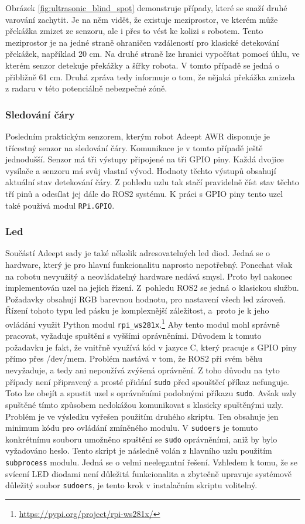 Obrázek \ref{fig:ultrasonic_blind_spot} demonstruje případy, které se snaží druhé varování zachytit. Je na něm vidět, že existuje meziprostor, ve kterém může překážka zmizet ze senzoru, ale i přes to vést ke kolizi s robotem. Tento meziprostor je na jedné straně ohraničen vzdáleností pro klasické detekování překážek, například 20 cm. Na druhé straně lze hranici vypočítat pomocí úhlu, ve kterém senzor detekuje překážky a šířky robota.
V tomto případě se jedná o přibližně 61 cm. Druhá zpráva tedy informuje o tom, že nějaká překážka zmizela z radaru v této potenciálně nebezpečné zóně.

\subsubsection*{Sledování čáry}
Posledním praktickým senzorem, kterým robot Adeept AWR disponuje je třícestný senzor na sledování čáry.
Komunikace je v tomto případě ještě jednodušší. Senzor má tři výstupy připojené na tři GPIO piny. Každá dvojice vysílače a senzoru má svůj vlastní vývod. Hodnoty těchto výstupů obsahují aktuální stav detekování čáry. Z pohledu uzlu tak stačí pravidelně číst stav těchto tří pinů a odesílat jej dále do ROS2 systému. K práci s GPIO piny tento uzel také používá modul \verb|RPi.GPIO|.

\subsubsection*{Led}
Součástí Adeept sady je také několik adresovatelných led diod. Jedná se o hardware, který je pro hlavní funkcionalitu naprosto nepotřebný. Ponechat však na robotu nevyužitý a neovládatelný hardware nedává smysl. Proto byl nakonec implementován uzel na jejich řízení. Z~pohledu ROS2 se jedná o klasickou službu. Požadavky obsahují RGB barevnou hodnotu, pro nastavení všech led zároveň. Řízení tohoto typu led pásku je komplexnější záležitost, a~proto je k jeho ovládání využit Python modul \verb|rpi_ws281x|.\footnote{\url{https://pypi.org/project/rpi-ws281x/}}
Aby tento modul mohl správně pracovat, vyžaduje spuštění s vyššími oprávněními. Důvodem k tomuto požadavku je fakt, že vnitřně využívá kód v jazyce C, který pracuje s GPIO piny přímo přes /dev/mem. Problém nastává v tom, že ROS2 při svém běhu nevyžaduje, a tedy ani nepoužívá zvýšená oprávnění. Z toho důvodu na tyto případy není připravený a prosté přidání \verb|sudo| před spouštěcí příkaz nefunguje. Toto lze obejít a spustit uzel s oprávněními podobnými příkazu \verb|sudo|. Avšak uzly spuštěné tímto způsobem nedokážou komunikovat s klasicky spuštěnými uzly. 
Problém je ve výsledku vyřešen použitím druhého skriptu. Ten obsahuje jen minimum kódu pro ovládání zmíněného modulu. V \verb|sudoers| je tomuto konkrétnímu souboru umožněno spuštění se \verb|sudo| oprávněními, aniž by bylo vyžadováno heslo. Tento skript je následně volán z hlavního uzlu použitím \verb|subprocess| modulu. Jedná se o velmi neelegantní řešení. Vzhledem k tomu, že se svícení LED diodami není důležitá funkcionalita a zbytečně upravuje systémově důležitý soubor \verb|sudoers|, je tento krok v instalačním skriptu volitelný.

